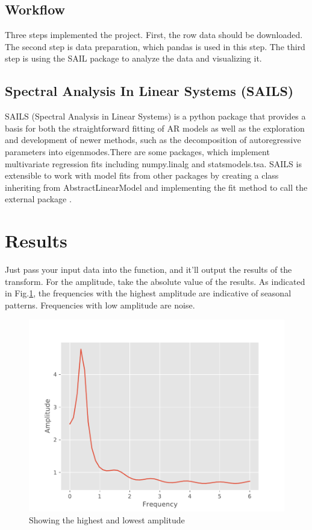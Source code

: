 \documentclass[12pt]{article}
\begin{document}
\subsection{Workflow}
Three steps implemented the project. First, the row data should be downloaded. The second step is data preparation, which pandas is used in this step. The third step is using the SAIL package to analyze the data and visualizing it.  

\subsection{Spectral Analysis In Linear Systems (SAILS)}

SAILS (Spectral Analysis in Linear Systems) is a python package that provides a basis for both the straightforward fitting of AR models as well as the exploration and development of newer methods, such as the decomposition of autoregressive parameters into eigenmodes.There are some packages, which implement multivariate regression fits including numpy.linalg and statsmodels.tsa. SAILS is extensible to work with model fits from other packages by creating a class inheriting from AbstractLinearModel and implementing the fit method to call the external package \cite{SAILS}.



\section{Results}

Just pass your input data into the function, and it’ll output the results of the transform. For the amplitude, take the absolute value of the results. As indicated in Fig.\ref{fig:fourier}, the frequencies with the highest amplitude are indicative of seasonal patterns. Frequencies with low amplitude are noise.

\begin{figure}[h]
    \centering
    \includegraphics[scale = 0.6]{fourier.pdf}
    \caption{Showing the highest and lowest amplitude}
    \label{fig:fourier}
\end{figure}
\newpage


\end{document}
